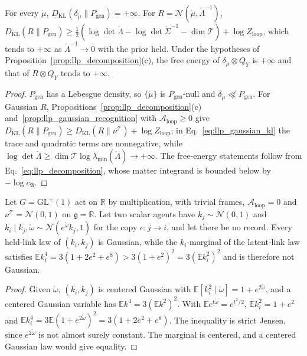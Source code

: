 \begin{proposition}\label{prop:llp_point_mass}
For every $\mathring\mu$, $D_{\mathrm{KL}}(\delta_{\mathring\mu}\|P_{\mathrm{gen}})=+\infty$. For $R=\mathcal N(\mathring\mu,\mathring\Lambda^{-1})$,
$D_{\mathrm{KL}}(R\|P_{\mathrm{gen}})\geq\frac12(\log\det\mathring\Lambda-\log\det\mathring\Sigma^{-1}-\dim\mathcal T)+\log Z_{\mathrm{loop}}$, which tends to $+\infty$ as $\mathring\Lambda^{-1}\to0$ with the prior held. Under the hypotheses of Proposition~\ref{prop:llp_decomposition}(c), the free energy of $\delta_{\mathring\mu}\otimes Q_Y$ is $+\infty$ and that of $R\otimes Q_Y$ tends to $+\infty$.
\end{proposition}

\begin{proof}
$P_{\mathrm{gen}}$ has a Lebesgue density, so $\{\mathring\mu\}$ is $P_{\mathrm{gen}}$-null and $\delta_{\mathring\mu}\not\ll P_{\mathrm{gen}}$. For Gaussian $R$, Propositions~\ref{prop:llp_decomposition}(c) and~\ref{prop:llp_gaussian_recognition} with $\mathcal A_{\mathrm{loop}}\geq0$ give $D_{\mathrm{KL}}(R\|P_{\mathrm{gen}})\geq D_{\mathrm{KL}}(R\|\nu^{\mathcal T})+\log Z_{\mathrm{loop}}$; in Eq.~\eqref{eq:llp_gaussian_kl} the trace and quadratic terms are nonnegative, while $\log\det\mathring\Lambda\geq\dim\mathcal T\log\lambda_{\min}(\mathring\Lambda)\to+\infty$. The free-energy statements follow from Eq.~\eqref{eq:llp_decomposition}, whose matter integrand is bounded below by $-\log c_{\mathfrak A}$.
\end{proof}

\begin{proposition}\label{prop:llp_nongaussian_marginal}
Let $G=\mathrm{GL}^+(1)$ act on $\mathbb R$ by multiplication, with trivial frames, $\mathcal A_{\mathrm{loop}}=0$ and $\nu^{\mathcal T}=\mathcal N(0,1)$ on $\mathfrak g=\mathbb R$. Let two scalar agents have $k_j\sim\mathcal N(0,1)$ and $k_i\mid k_j,\mathring\omega\sim\mathcal N(e^{\mathring\omega}k_j,1)$ for the copy $e:j\to i$, and let there be no record. Every held-link law of $(k_i,k_j)$ is Gaussian, while the $k_i$-marginal of the latent-link law satisfies $\mathbb Ek_i^4=3(1+2e^2+e^8)>3(1+e^2)^2=3(\mathbb Ek_i^2)^2$ and is therefore not Gaussian.
\end{proposition}

\begin{proof}
Given $\mathring\omega$, $(k_i,k_j)$ is centered Gaussian with $\mathbb E[k_i^2\mid\mathring\omega]=1+e^{2\mathring\omega}$, and a centered Gaussian variable has $\mathbb Ek^4=3(\mathbb Ek^2)^2$. With $\mathbb Ee^{t\mathring\omega}=e^{t^2/2}$, $\mathbb Ek_i^2=1+e^2$ and $\mathbb Ek_i^4=3\mathbb E(1+e^{2\mathring\omega})^2=3(1+2e^2+e^8)$. The inequality is strict Jensen, since $e^{2\mathring\omega}$ is not almost surely constant. The marginal is centered, and a centered Gaussian law would give equality.
\end{proof}

